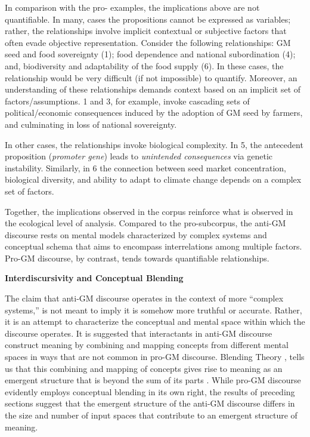 In comparison with the pro- examples, the implications above are not quantifiable. In many, cases the propositions cannot be expressed as variables; rather, the relationships involve implicit contextual or subjective factors that often evade objective representation. Consider the following relationships: GM seed and food sovereignty (1); food dependence and national subordination (4); and, biodiversity and adaptability of the food supply (6). In these cases, the relationship would be very difficult (if not impossible) to quantify. Moreover, an understanding of these relationships demands context based on an implicit set of factors/assumptions. 1 and 3, for example, invoke cascading sets of political/economic consequences induced by the adoption of GM seed by farmers, and culminating in loss of national sovereignty.     

In other cases, the relationships invoke biological complexity. In 5, the antecedent proposition (\textit{promoter gene}) leads to \textit{unintended consequences} via genetic instability. Similarly, in 6 the connection between seed market concentration, biological diversity, and ability to adapt to climate change depends on a complex set of factors.

Together, the implications observed in the corpus reinforce what is observed in the ecological level of analysis. Compared to the pro-subcorpus, the anti-GM discourse rests on mental models characterized by complex systems and conceptual schema that aims to encompass interrelations among multiple factors. Pro-GM discourse, by contrast, tends towards quantifiable relationships. 

\textbf{Interdiscursivity and Conceptual Blending}

The claim that anti-GM discourse operates in the context of more ``complex systems,'' is not meant to imply it is somehow more truthful or accurate. Rather, it is an attempt to characterize the conceptual and mental space within which the discourse operates. It is suggested that interactants in anti-GM discourse construct meaning by combining and mapping concepts from different mental spaces in ways that are not common in pro-GM discourse. Blending Theory \citep{Turner2002}, tells us that this combining and mapping of concepts gives rise to meaning as an emergent structure that is beyond the sum of its parts \citep[403]{Evans2006a}. While pro-GM discourse evidently employs conceptual blending in its own right, the results of preceding sections suggest that the emergent structure of the anti-GM discourse differs in the size and number of input spaces that contribute to an emergent structure of meaning. 

